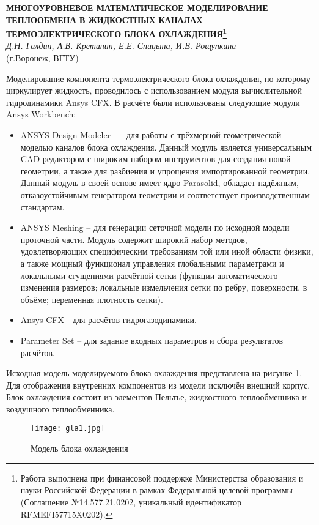\begin{center}{ \bf  МНОГОУРОВНЕВОЕ МАТЕМАТИЧЕСКОЕ МОДЕЛИРОВАНИЕ ТЕПЛООБМЕНА В ЖИДКОСТНЫХ КАНАЛАХ ТЕРМОЭЛЕКТРИЧЕСКОГО БЛОКА ОХЛАЖДЕНИЯ\footnote{Работа выполнена при финансовой поддержке Министерства образования и науки Российской Федерации в рамках Федеральной целевой программы (Соглашение №14.577.21.0202, уникальный идентификатор RFMEFI57715X0202).}}\\
{\it Д.Н. Галдин, А.В. Кретинин, Е.Е. Спицына, И.В. Рощупкина} \\
(г.Воронеж, ВГТУ)
\end{center}

Моделирование компонента термоэлектрического блока охлаждения, по которому циркулирует жидкость, проводилось с использованием модуля вычислительной гидродинамики Ansys CFX.
В расчёте были использованы следующие модули Ansys Workbench:
\begin{itemize}
	\item
		ANSYS Design Modeler~--- для работы с трёхмерной геометрической моделью каналов блока охлаждения.
		Данный модуль является универсальным CAD-ре\-да\-к\-то\-ром с широким набором инструментов для создания новой геометрии, а также для разбиения и упрощения импортированной геометрии. Данный модуль в своей основе имеет ядро Parasolid, обладает надёжным, отказоустойчивым генератором геометрии и соответствует производственным стандартам.
	\item
		ANSYS Meshing – для генерации сеточной модели по исходной модели проточной части. Модуль содержит широкий набор методов, удовлетворяющих специфическим требованиям той или иной области физики, а также мощный функционал управления глобальными параметрами и локальными сгущениями расчётной сетки (функции автоматического изменения размеров; локальные измельчения сетки по ребру, поверхности, в объёме; переменная плотность сетки).
	\item
		Ansys CFX - для расчётов гидрогазодинамики.
	\item
		Parameter Set – для задание входных параметров и сбора результатов расчётов.
\end{itemize}
Исходная модель моделируемого блока охлаждения представлена на рисунке 1. Для отображения внутренних компонентов из модели исключён внешний корпус. Блок охлаждения состоит из элементов Пельтье, жидкостного теплообменника и воздушного теплообменника.

\begin{figure}[h!]
	\centering
	\texttt{[image: gla1.jpg]}
	\caption{Модель блока охлаждения}
\end{figure}

